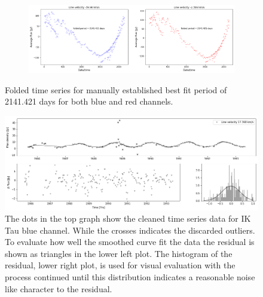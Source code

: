 \begin{figure}
\centering
  \begin{subfigure}{\hsize}
    \includegraphics[width=0.99\hsize]{images/OH357_ts_blue5_red54_detrended_folded.png}
  \end{subfigure}%
\caption{\label{fig:oh357period}Folded time series for manually established best fit period of 2141.421 days for both blue and red channels.}
\end{figure}


\begin{figure}
\includegraphics[width=\hsize, clip,angle=0]{images/iktausRAW_blue_channels_cleaned.png}
\caption{\label{fig:iktaublueclean}The dots in the top graph show the cleaned time series data for IK Tau blue channel. While the crosses indicates the discarded outliers. To evaluate how well the smoothed curve fit the data the residual is shown as triangles in the lower left plot. The histogram of the residual, lower right plot, is used for visual evaluation with the process continued until this distribution indicates a reasonable noise like character to the residual.}
\end{figure}
